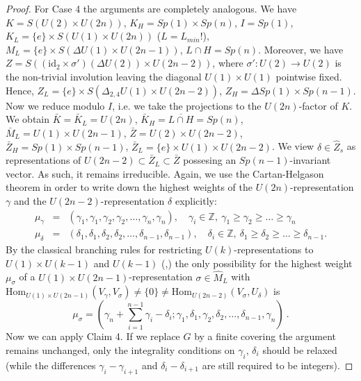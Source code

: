 \documentclass[10]{amsart}
\theoremstyle{remark}
\theoremstyle{definition}
\numberwithin{equation}{section}
\newcommand{\Z}{\mathbb{Z}}         %
\newcommand{\Hom}{\mathrm{Hom}}
\newcommand{\id}{\mathrm{id}}
\begin{document}
{\begin{proof}
For Case 4 the arguments are completely analogous. We have $K=S(U(2)\times U(2n))$, $K_H=Sp(1)\times Sp(n)$, $I=Sp(1)$, $K_L=\{e\}\times S(U(1)\times U(2n))$ ($L=L_{min}$!),
$M_L=\{e\}\times S(\Delta U(1)\times U(2n-1))$, $L\cap H=Sp(n)$.
Moreover, we have $Z=S((\id_2\times \sigma')(\Delta U(2))\times U(2n-2))$, where $\sigma': U(2)\rightarrow U(2)$ is the non-trivial involution leaving the diagonal $U(1)\times U(1)$ pointwise fixed. Hence, $Z_L=\{e\}\times S(\Delta_{2,4}U(1)\times U(2n-2))$, $Z_H=\Delta Sp(1)\times Sp(n-1)$. Now we reduce modulo $I$, i.e.
we take the projections to the $U(2n)$-factor of $K$. We obtain $\bar K=\bar K_L= U(2n)$, $\bar K_H=\overline{L\cap H}=Sp(n)$, $\bar M_L=U(1)\times U(2n-1)$, 
$\bar Z=U(2)\times U(2n-2)$, $\bar Z_H=Sp(1)\times Sp(n-1)$, $\bar Z_L=\{e\}\times U(1)\times U(2n-2)$. We view $\delta\in \widehat Z_{s}$
as representations of $U(2n-2)\subset \bar Z_L\subset\bar Z$ possesing an $Sp(n-1)$-invariant vector. As such, it remains irreducible. Again, we use the Cartan-Helgason theorem
in order to write down the highest weights of the $U(2n)$-representation $\gamma$ and the $U(2n-2)$-representation $\delta$ explicitly:
\begin{eqnarray*} \mu_\gamma&=& (\gamma_1,\gamma_1,\gamma_2,\gamma_2,\dots,\gamma_{n},\gamma_{n}),\quad \gamma_i\in\Z,\ \gamma_1\ge\gamma_2\ge\dots\ge\gamma_{n}\\
\mu_\delta&=&(\delta_1,\delta_1,\delta_2,\delta_2,\dots,\delta_{n-1},\delta_{n-1}),\quad \delta_i\in\Z,\ \delta_1\ge\delta_2\ge\dots\ge\delta_{n-1}.
\end{eqnarray*}
By the classical branching rules for restricting $U(k)$-representations to $U(1)\times U(k-1)$ and $U(k-1)$ (\cite{Zhe73},\cite{GW98}) the only possibility for the highest weight $\mu_\sigma$ of a $U(1)\times U(2n-1)$-representation $\sigma\in \widehat M_{L}$ with
$\Hom_{U(1)\times U(2n-1)}(V_\gamma, V_{\sigma})\ne\{0\}\ne \Hom_{U(2n-2)}(V_\sigma,U_\delta)$ is
$$ \mu_\sigma=(\gamma_n+\sum_{i=1}^{n-1} \gamma_i-\delta_i;\gamma_1,\delta_1,\gamma_2,\delta_2,\dots,\delta_{n-1},\gamma_{n})\ .$$
Now we can apply Claim 4. If we replace $G$  by a finite covering the argument remains unchanged, only the integrality conditions on $\gamma_i$, $\delta_i$ should be relaxed (while
the differences $\gamma_i-\gamma_{i+1}$ and $\delta_i-\delta_{i+1}$ are still required to be integers). 
\end{proof}

}
\end{document}
